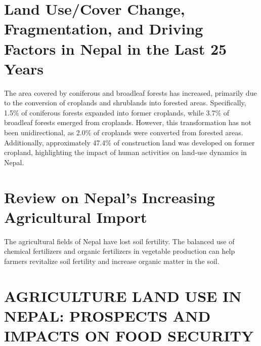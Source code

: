 \documentclass[a4paper,12pt]{article}
\begin{document}
\section{Land Use/Cover Change, Fragmentation, and Driving Factors in Nepal in the Last 25 Years}
\parencite{ningLandUseCover}


The area covered by coniferous and broadleaf forests has increased, primarily due to the conversion of croplands and shrublands into forested areas. Specifically, 1.5\% of coniferous forests expanded into former croplands, while 3.7\% of broadleaf forests emerged from croplands. However, this transformation has not been unidirectional, as 2.0\% of croplands were converted from forested areas. Additionally, approximately 47.4\% of construction land was developed on former cropland, highlighting the impact of human activities on land-use dynamics in Nepal.

\section{Review on Nepal’s Increasing Agricultural Import}
\parencite{simkhadaReviewNepalsIncreasing2019}
The agricultural fields of Nepal have lost soil fertility. The balanced use of chemical fertilizers and organic fertilizers in vegetable production can help farmers revitalize soil fertility and increase organic matter in the soil.






\section{AGRICULTURE LAND USE IN NEPAL: PROSPECTS AND IMPACTS ON FOOD SECURITY}
\parencite{timilsinaAGRICULTURELANDUSE2019}
\end{document}
